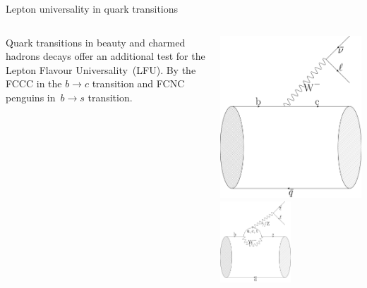 \documentclass[9pt,usenames,dvipsnames]{beamer}
\begin{document}
\begin{frame}{Lepton universality in quark transitions}
	\begin{columns}[c]
	Quark transitions in beauty and charmed hadrons decays offer an additional  test for the Lepton Flavour Universality~(LFU). By the FCCC in the $ b\to c$ transition and FCNC penguins  in~$ b \to s$ transition.
		\begin{center}
			\includegraphics[width=0.5 \textwidth]{./assets/B_to_D_SM}\\
			\includegraphics[width= 0.5\textwidth]{./assets/B_to_K_SM} 
		\end{center}
	\end{columns}
\end{frame}%
\end{document}
